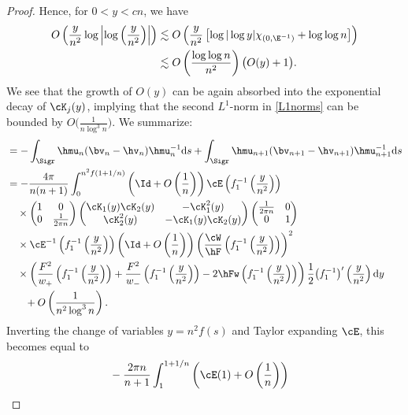 \begin{proof}
Hence, for $0 < y < cn$, we have
\begin{align*}
 O\left(\frac{y}{n^2}\log \left|\log \left( \frac{y}{n^2}\right)\right| \right)&\lesssim O\left( \frac{y}{n^2} \left[\log | \log y |\chi_{(0, \E^{-1})}+ \log \log n\right]\right)
 \\
 &\lesssim O\left(\frac{\log \log n}{n^2} \right) \big(O(y)+1\big).
\end{align*}
We see that the growth of $O(y)$ can be again absorbed into the exponential decay of $\cK_j(y)$, implying that the second $L^1$-norm in \eqref{L1norms} can be bounded by $O\big(\frac{1}{n \log^3 n}\big)$. We summarize:
\begin{align*}
 &= -\int_{\Sigr} \hmu_n(\bv_n-\hv_n)\hmu_n^{-1} {\rm d}s + \int_{\Sigr} \hmu_{n+1}(\bv_{n+1}-\hv_{n+1})\hmu^{-1}_{n+1} {\rm d}s
 \\
 &=-\frac{4\pi}{n(n+1)} \int_0^{n^2 f(1+1/n)} \left(\Id + O\left(\frac{1}{n}\right)\right)\cE\left(f_1^{-1}\left(\frac{y}{n^2}\right)\right)
 \\
 &\quad\times
 \begin{pmatrix}
 1 & 0
 \\
 0 & \frac{1}{2\pi n}
 \end{pmatrix}
 \begin{pmatrix}
 \cK_1(y)\cK_2(y) & -\cK^2_1(y)
 \\
 \cK^2_2(y) & -\cK_1(y)\cK_2(y)
 \end{pmatrix}
 \begin{pmatrix}
 \frac{1}{2\pi n} & 0
 \\
 0 & 1
 \end{pmatrix}
\\
&\quad\times\cE^{-1}\left(f_1^{-1}\left(\frac{y}{n^2}\right)\right)\left(\Id + O\left(\frac{1}{n}\right)\right)
 \left(\frac{\cW}{\hF}\left(f_1^{-1}\left(\frac{y}{n^2}\right)\right)\right)^2
 \\
 &\quad\times
 \left(\frac{F^2}{w_+}\left(f_1^{-1}\left(\frac{y}{n^2}\right)\right)+\frac{F^2}{w_-}\left(f_1^{-1}\left(\frac{y}{n^2}\right)\right)-2\hFw\left(f_1^{-1}\left(\frac{y}{n^2}\right)\right)\right)\frac{1}{2}\big(f_1^{-1}\big)'\left(\frac{y}{n^2}\right){\rm d}y
 \\
 &\phantom{\quad\times}{}+O\left(\frac{1}{n^2\log^3 n}\right).
\end{align*}
 Inverting the change of variables $y = n^2 f(s)$ and Taylor expanding $\cE$, this becomes equal to
\begin{align}
 &-\frac{2\pi n}{n+1} \int_1^{1+1/n} \left( \cE(1) + O\left( \frac{1}{n} \right)\right)

\end{align}
\end{proof}
